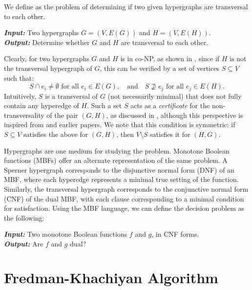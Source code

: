 We define \TransHyp{} as the problem of determining if two given hypergraphs are transversal to each other.

\begin{problem}
\textbf{\textit{Input:}} Two hypergraphs $G=(V,E(G))$ and $H=(V,E(H))$.\\
\textbf{\textit{Output:}} Determine whether $G$ and $H$ are transversal to each other.
\end{problem}

Clearly, \TransHyp{} for two hypergraphs $G$ and $H$ is in co-NP, as shown in \cite{FK96}, since if $H$ is not the transversal hypergraph of $G$, this can be verified by a set of vertices $S\subseteq V$ such that:
\begin{equation}\label{eq:witness}
S\cap e_i\neq\emptyset\text{ for all }e_i\in E(G),\quad\text{and}\quad S\nsupseteq e_j\text{ for all }e_j\in E(H).
\end{equation}
Intuitively, $S$ is a transversal of $G$ (not necessarily minimal) that does not fully contain any hyperedge of $H$. Such a set $S$ acts as a \emph{certificate} for the non-transversality of the pair $(G,H)$, as discussed in \cite{Rau11}, although this perspective is inspired from \cite{FK96} and earlier papers. We note that this condition is symmetric: if $S\subseteq V$ satisfies the above for $(G,H)$, then $V\setminus S$ satisfies it for $(H,G)$.

Hypergraphs are one medium for studying the \TransHyp{} problem. Monotone Boolean functions (MBFs) offer an alternate representation of the same problem. A Sperner hypergraph corresponds to the disjunctive normal form (DNF) of an MBF, where each hyperedge represents a minimal true setting of the function. Similarly, the transversal hypergraph corresponds to the conjunctive normal form (CNF) of the dual MBF, with each clause corresponding to a minimal condition for satisfaction. Using the MBF language, we can define the decision problem as the following:

\begin{problem}
\textbf{\textit{Input:}} Two monotone Boolean functions $f$ and $g$, in CNF forms.\\
\textbf{\textit{Output:}} Are $f$ and $g$ dual?
\end{problem}

\section{Fredman-Khachiyan Algorithm \FKA}

